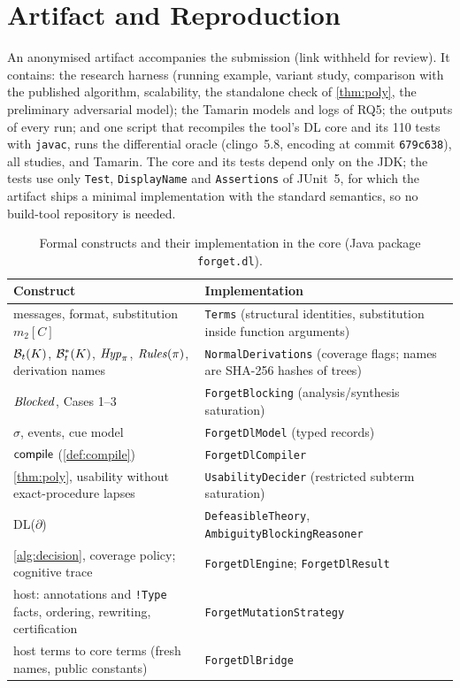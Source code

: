 \section{Artifact and Reproduction}
\label{app:artifact}

An anonymised artifact accompanies the submission (link withheld for review). It contains: the research harness (running example, variant study, comparison with the published algorithm, scalability, the standalone check of \cref{thm:poly}, the preliminary adversarial model); the Tamarin models and logs of RQ5; the outputs of every run; and one script that recompiles the tool's DL core and its 110 tests with \texttt{javac}, runs the differential oracle (clingo~5.8, encoding at commit \texttt{679c638}), all studies, and Tamarin. The core and its tests depend only on the JDK; the tests use only \texttt{Test}, \texttt{DisplayName} and \texttt{Assertions} of JUnit~5, for which the artifact ships a minimal implementation with the standard semantics, so no build-tool repository is needed.

\begin{table}[t]
\centering\scriptsize
\caption{Formal constructs and their implementation in the core (Java package \texttt{forget.dl}).}
\label{tab:mapping}
\begingroup
\setlength{\tabcolsep}{9pt}
\begin{tabular}{@{}>{\raggedright\arraybackslash}p{4.2cm}>{\raggedright\arraybackslash}p{7.5cm}@{}}
\toprule
Construct & Implementation \\
\midrule
messages, format, substitution $m_2[C]$ &
\texttt{Terms} (structural identities, substitution inside function arguments) \\
$\mathcal{B}_t(K)$, $\mathcal{B}_t^*(K)$, $\mathit{Hyp}_\pi$, $\mathit{Rules}(\pi)$, derivation names &
\texttt{NormalDerivations} (coverage flags; names are SHA-256 hashes of trees) \\
$\mathit{Blocked}$, Cases 1--3 &
\texttt{ForgetBlocking} (analysis/synthesis saturation) \\
$\sigma$, events, cue model &
\texttt{ForgetDlModel} (typed records) \\
$\mathsf{compile}$ (\cref{def:compile}) &
\texttt{ForgetDlCompiler} \\
\cref{thm:poly}, usability without exact-procedure lapses &
\texttt{UsabilityDecider} (restricted subterm saturation) \\
DL($\partial$) &
\texttt{DefeasibleTheory}, \texttt{AmbiguityBlockingReasoner} \\
\cref{alg:decision}, coverage policy; cognitive trace &
\texttt{ForgetDlEngine}; \texttt{ForgetDlResult} \\
host: annotations and \texttt{!Type} facts, ordering, rewriting, certification &
\texttt{ForgetMutationStrategy} \\
host terms to core terms (fresh names, public constants) &
\texttt{ForgetDlBridge} \\
\bottomrule
\end{tabular}
\endgroup
\end{table}
